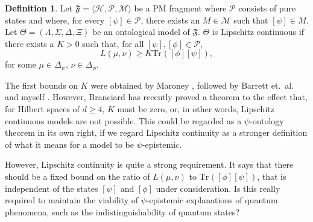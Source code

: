\documentclass[DIV=calc,paper=a4,fontsize=11pt,twocolumn]{scrartcl} %
\theoremstyle{definition}
\newtheorem{definition}{Definition}[section]
\theoremstyle{plain}
\newcommand{\Proj}[1]{\ensuremath{\left [ #1 \right ]}}
\newcommand{\Hilb}[1][]{\ensuremath{\mathcal{H}_{#1}}}
\newcommand{\Tr}[2][]{\ensuremath{\text{Tr}_{#1} \left ( #2 \right )}}
\begin{document}
\begin{definition}
Let $\mathfrak{F} = \langle \Hilb, \mathcal{P}, \mathcal{M} \rangle$
be a PM fragment where $\mathcal{P}$ consists of pure states and
where, for every $\Proj{\psi} \in \mathcal{P}$, there exists an $M
\in \mathcal{M}$ such that $\Proj{\psi} \in M$.  Let $\Theta =
(\Lambda, \Sigma, \Delta, \Xi)$ be an ontological model of
$\mathfrak{F}$.  $\Theta$ is Lipschitz continuous if there exists a $K
> 0$ such that, for all $\Proj{\psi}, \Proj{\phi} \in \mathcal{P}$,
\begin{equation}
L(\mu,\nu) \geq K \Tr{\Proj{\phi}\Proj{\psi}},
\end{equation}
for some $\mu \in \Delta_{\psi}$, $\nu \in \Delta_{\phi}$.
\end{definition}

The first bounds on $K$ were obtained by Maroney \cite{Maroney2012},
followed by Barrett et.\ al.\ \cite{Barrett2013} and myself
\cite{Leifer2014}.  However, Branciard \cite{Branciard2014} has
recently proved a theorem to the effect that, for Hilbert spaces of $d
\geq 4$, $K$ must be zero, or, in other words, Lipschitz continuous
models are not possible.  This could be regarded as a $\psi$-ontology
theorem in its own right, if we regard Lipschitz continuity as a
stronger definition of what it means for a model to be
$\psi$-epistemic.

However, Lipschitz continuity is quite a strong requirement.  It says
that there should be a fixed bound on the ratio of $L(\mu,\nu)$ to
$\Tr{\Proj{\phi}\Proj{\psi}}$, that is independent of the states
$\Proj{\psi}$ and $\Proj{\phi}$ under consideration.  Is this really
required to maintain the viability of $\psi$-epistemic explanations of
quantum phenomena, such as the indistinguishability of quantum states?
\end{document}
